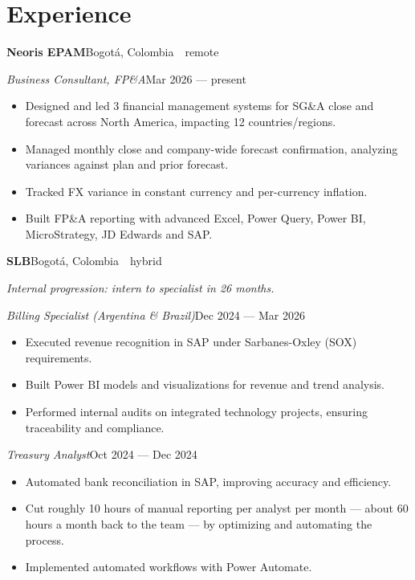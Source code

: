 \documentclass[a4paper,10pt]{article}
\newcommand{\headline}[2]{\needspace{3\baselineskip}\textbf{\color{ink}#1}\hfill{\small #2}\par}
\newcommand{\subline}[2]{\textit{#1}\hfill{\small #2}\par}
\begin{document}
\section*{Experience}
\headline{Neoris EPAM}{Bogotá, Colombia \,\textperiodcentered\, remote}
\vspace{1pt}
\subline{Business Consultant, FP\&A}{Mar 2026 --- present}
\begin{itemize}[leftmargin=1.1em, itemsep=0pt, topsep=1pt, parsep=0pt]
  \item Designed and led 3 financial management systems for SG\&A close and forecast across North America, impacting 12 countries/regions.
  \item Managed monthly close and company-wide forecast confirmation, analyzing variances against plan and prior forecast.
  \item Tracked FX variance in constant currency and per-currency inflation.
  \item Built FP\&A reporting with advanced Excel, Power Query, Power BI, MicroStrategy, JD Edwards and SAP.
\end{itemize}
\vspace{4pt}
\headline{SLB}{Bogotá, Colombia \,\textperiodcentered\, hybrid}
{\small\itshape\color{cold} Internal progression: intern to specialist in 26 months.}\par
\vspace{1pt}
\subline{Billing Specialist (Argentina \& Brazil)}{Dec 2024 --- Mar 2026}
\begin{itemize}[leftmargin=1.1em, itemsep=0pt, topsep=1pt, parsep=0pt]
  \item Executed revenue recognition in SAP under Sarbanes-Oxley (SOX) requirements.
  \item Built Power BI models and visualizations for revenue and trend analysis.
  \item Performed internal audits on integrated technology projects, ensuring traceability and compliance.
\end{itemize}
\subline{Treasury Analyst}{Oct 2024 --- Dec 2024}
\begin{itemize}[leftmargin=1.1em, itemsep=0pt, topsep=1pt, parsep=0pt]
  \item Automated bank reconciliation in SAP, improving accuracy and efficiency.
  \item Cut roughly 10 hours of manual reporting per analyst per month --- about 60 hours a month back to the team --- by optimizing and automating the process.
  \item Implemented automated workflows with Power Automate.
\end{itemize}
\end{document}
